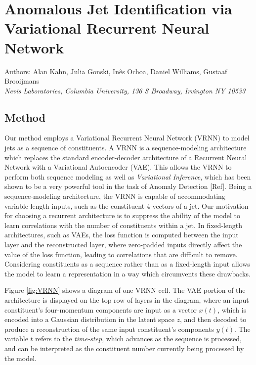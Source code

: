 \documentclass[letterpaper,11pt]{article}
\begin{document}
\section*{Anomalous Jet Identification via Variational Recurrent Neural Network}
Authors: Alan Kahn, Julia Gonski, In\^{e}s Ochoa, Daniel Williams, Gustaaf Brooijmans \\ \textit{Nevis Laboratories, Columbia University, 136 S Broadway, Irvington NY 10533}\\


\subsection{Method}
\label{sec:method}

Our method employs a Variational Recurrent Neural Network (VRNN) to model jets as a sequence of constituents. A VRNN is a sequence-modeling architecture which replaces the standard encoder-decoder architecture of a Recurrent Neural Network with a Variational Autoencoder (VAE). This allows the VRNN to perform both sequence modeling as well as \textit{Variational Inference}, which has been shown to be a very powerful tool in the task of Anomaly Detection [Ref]. Being a sequence-modeling architecture, the VRNN is capable of accommodating variable-length inputs, such as the constituent 4-vectors of a jet. Our motivation for choosing a recurrent architecture is to suppress the ability of the model to learn correlations with the number of constituents within a jet. In fixed-length architectures, such as VAEs, the loss function is computed between the input layer and the reconstructed layer, where zero-padded inputs directly affect the value of the loss function, leading to correlations that are difficult to remove. Considering constituents as a sequence rather than as a fixed-length input allows the model to learn a representation in a way which circumvents these drawbacks.


Figure \ref{fig:VRNN} shows a diagram of one VRNN cell. The VAE portion of the architecture is displayed on the top row of layers in the diagram, where an input constituent's four-momentum components are input as a vector $x(t)$, which is encoded into a Gaussian distribution in the latent space $z$, and then decoded to produce a reconstruction of the same input constituent's components $y(t)$. The variable $t$ refers to the \textit{time-step}, which advances as the sequence is processed, and can be interpreted as the constituent number currently being processed by the model. 
\end{document}
